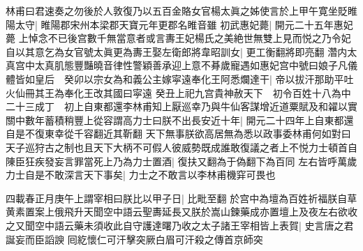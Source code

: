 林甫曰君速奏之勿後於人敦復乃以五百金賂女官楊太眞之姊使言於上甲午寛坐貶睢陽太守|{
	睢陽郡宋州本梁郡天寶元年更郡名睢音雖}
初武惠妃薨|{
	開元二十五年惠妃薨}
上悼念不已後宫數千無當意者或言夀王妃楊氏之美絶世無雙上見而悦之乃令妃自以其意乞為女官號太眞更為夀王娶左衛郎將韋昭訓女|{
	更工衡翻將即亮翻}
濳内太真宫中太真肌態豐豔曉音律性警穎善承迎上意不朞歲寵遇如惠妃宫中號曰娘子凡儀體皆如皇后　癸卯以宗女為和義公主嫁寜遠奉化王阿悉爛達干|{
	帝以拔汗那助平吐火仙冊其王為奉化王改其國曰寜遠}
癸丑上祀九宫貴神赦天下　初令百姓十八為中二十三成丁　初上自東都還李林甫知上厭巡幸乃與牛仙客謀增近道粟賦及和糴以實關中數年蓄積稍豐上從容謂高力士曰朕不出長安近十年|{
	開元二十四年上自東都還自是不復東幸從千容翻近其靳翻}
天下無事朕欲高居無為悉以政事委林甫何如對曰天子巡狩古之制也且天下大柄不可假人彼威勢既成誰敢復議之者上不悦力士頓首自陳臣狂疾發妄言罪當死上乃為力士置酒|{
	復扶又翻為于偽翻下為百同}
左右皆呼萬歲力士自是不敢深言天下事矣|{
	力士之不敢言以李林甫機穽可畏也}


四載春正月庚午上謂宰相曰朕比以甲子日|{
	比毗至翻}
於宫中為壇為百姓祈福朕自草黄素置案上俄飛升天聞空中語云聖夀延長又朕於嵩山鍊藥成亦置壇上及夜左右欲收之又聞空中語云藥未須收此自守護達曙乃收之太子諸王宰相皆上表賀|{
	史言唐之君誕妄而臣謟諛}
囘紇懷仁可汗擊突厥白眉可汗殺之傳首京師突

